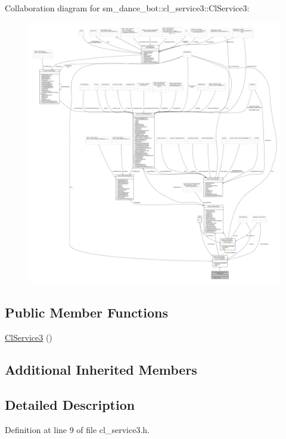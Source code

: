 Collaboration diagram for sm\+\_\+dance\+\_\+bot\+:\+:cl\+\_\+service3\+:\+:Cl\+Service3\+:
\nopagebreak
\begin{figure}[H]
\begin{center}
\leavevmode
\includegraphics[width=350pt]{classsm__dance__bot_1_1cl__service3_1_1ClService3__coll__graph}
\end{center}
\end{figure}
\subsection*{Public Member Functions}
\begin{DoxyCompactItemize}
\item 
\hyperlink{classsm__dance__bot_1_1cl__service3_1_1ClService3_ab03b879865a37e88ceb753e20dd43311}{Cl\+Service3} ()
\end{DoxyCompactItemize}
\subsection*{Additional Inherited Members}


\subsection{Detailed Description}


Definition at line 9 of file cl\+\_\+service3.\+h.



